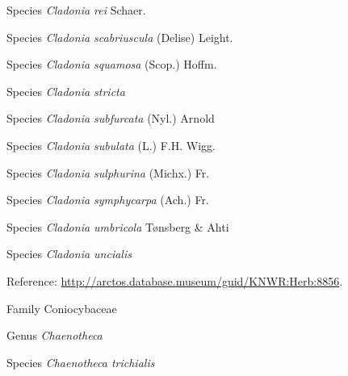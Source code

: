 \documentclass[9pt, article]{memoir}
\begin{document}
\begin{multicols}{2}
\vspace{6pt}\noindent\hspace{36pt}Species \textit{Cladonia rei} Schaer.


\vspace{6pt}\noindent\hspace{36pt}Species \textit{Cladonia scabriuscula} (Delise) Leight.


\vspace{6pt}\noindent\hspace{36pt}Species \textit{Cladonia squamosa} (Scop.) Hoffm.


\vspace{6pt}\noindent\hspace{36pt}Species \textit{Cladonia stricta}


\vspace{6pt}\noindent\hspace{36pt}Species \textit{Cladonia subfurcata} (Nyl.) Arnold


\vspace{6pt}\noindent\hspace{36pt}Species \textit{Cladonia subulata} (L.) F.H. Wigg.


\vspace{6pt}\noindent\hspace{36pt}Species \textit{Cladonia sulphurina} (Michx.) Fr.


\vspace{6pt}\noindent\hspace{36pt}Species \textit{Cladonia symphycarpa} (Ach.) Fr.


\vspace{6pt}\noindent\hspace{36pt}Species \textit{Cladonia umbricola} Tønsberg \& Ahti


\vspace{6pt}\noindent\hspace{36pt}Species \textit{Cladonia uncialis}


\vspace{6pt}Reference: 
\url{http://arctos.database.museum/guid/KNWR:Herb:8856}.

\vspace{6pt}\noindent\hspace{24pt}Family Coniocybaceae


\vspace{6pt}\noindent\hspace{30pt}Genus \textit{Chaenotheca}


\vspace{6pt}\noindent\hspace{36pt}Species \textit{Chaenotheca trichialis}



\end{multicols}
\end{document}
